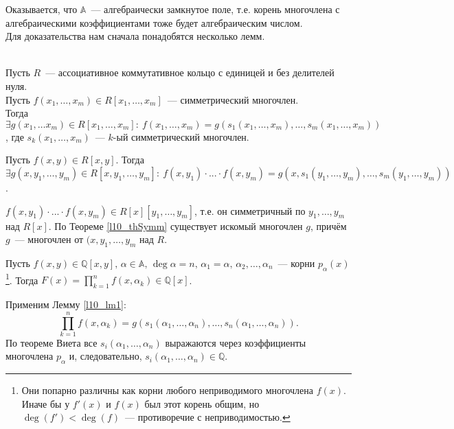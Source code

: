 Оказывается, что $\mathbb{A}$ — алгебраически замкнутое поле, т.е. корень многочлена с алгебраическими коэффициентами тоже будет алгебраическим числом.\\
Для доказательства нам сначала понадобятся несколько лемм.

\begin{theorem} \label{l10_thSymm}~\\
	Пусть $R$ — ассоциативное коммутативное кольцо с единицей и без делителей нуля.\\
	Пусть $f \left( x_1, \dots, x_m \right) \in R \left[ x_1, \dots, x_m \right]$ — симметрический многочлен.\\
	Тогда $\exists g\left( x_1, \dots x_m \right) \in R \left[ x_1, \dots, x_m \right]: \ f\left( x_1, \dots, x_m \right) = g\left( s_1\left( x_1, \dots, x_m \right), \dots, s_m\left( x_1, \dots, x_m \right) \right)$, где $s_k\left( x_1, \dots, x_m \right)$ — $k$-ый симметрический многочлен.
\end{theorem}

\begin{lemma} \label{l10_lm1}
	Пусть $f(x,y) \in R[x,y]$. Тогда
	$\displaystyle \exists g(x, y_1, \dots, y_m) \in R[x, y_1, \dots, y_m]: \ f(x,y_1)\cdot...\cdot f(x,y_m) = g(x,s_1(y_1,\dots,y_m),\dots,s_m(y_1,\dots,y_m))$.
\end{lemma}
\begin{pf}
	$f(x,y_1) \cdot ... \cdot f(x, y_m) \in R[x][y_1,\dots,y_m]$, т.е. он симметричный по $y_1,\dots,y_m$ над $R[x]$. По Теореме \ref{l10_thSymm} существует искомый многочлен $g$, причём $g$ — многочлен от $(x,y_1,\dots,y_m$ над $R$.
\end{pf}

\begin{lemma} \label{l10_lm2}
	Пусть $f(x,y) \in \mathbb{Q}[x,y], \, \alpha \in \mathbb{A}, \, \deg\alpha = n, \, \alpha_1 = \alpha, \, \alpha_2,\dots,\alpha_n$ — корни $p_\alpha(x)$\footnote{Они попарно различны как корни любого неприводимого многочлена $f(x)$. Иначе бы у $f'(x)$ и $f(x)$ был этот корень общим, но $\deg(f') < \deg(f)$ — противоречие с неприводимостью.}. Тогда $F(x) = \prod\limits_{k=1}^n f(x,\alpha_k) \in \mathbb{Q}[x]$.
\end{lemma}
\begin{pf}
	Применим Лемму \ref{l10_lm1}:
	$$\prod\limits_{k=1}^n f(x, \alpha_k) = g\left( s_1\left( \alpha_1, \dots, \alpha_n \right), \dots, s_n\left( \alpha_1, \dots, \alpha_n \right) \right).$$
	По теореме Виета все $s_i(\alpha_1,\dots,\alpha_n)$ выражаются через коэффициенты многочлена $p_\alpha$ и, следовательно, $s_i(\alpha_1,\dots,\alpha_n) \in \mathbb{Q}$.
\end{pf}

